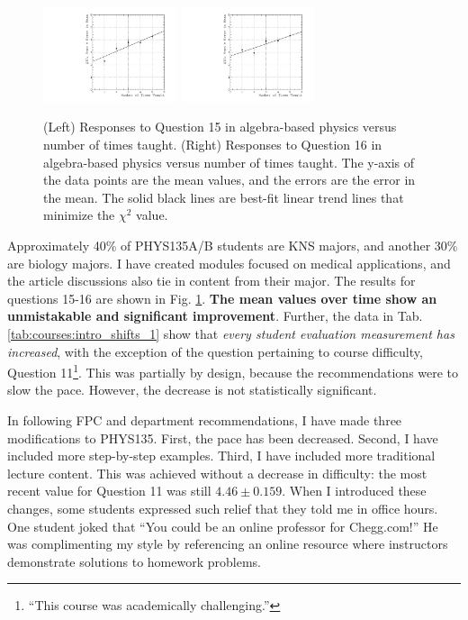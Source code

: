 \documentclass[../../main.tex]{subfiles}
\begin{document}
\begin{figure}
\centering
\includegraphics[width=0.35\textwidth]{Q15_algebra_based.pdf}
\includegraphics[width=0.35\textwidth]{Q16_algebra_based.pdf}
\caption{\label{fig:courses:intro_q15}  (Left) Responses to Question 15 in algebra-based physics versus number of times taught. (Right) Responses to Question 16 in algebra-based physics versus number of times taught.  The y-axis of the data points are the mean values, and the errors are the error in the mean.  The solid black lines are best-fit linear trend lines that minimize the $\chi^2$ value.}
\end{figure}

Approximately 40\% of PHYS135A/B students are KNS majors, and another 30\% are biology majors.  I have created modules focused on medical applications, and the article discussions also tie in content from their major.  The results for questions 15-16 are shown in Fig. \ref{fig:courses:intro_q15}.  \textbf{The mean values over time show an unmistakable and significant improvement}.  Further, the data in Tab. \ref{tab:courses:intro_shifts_1} show that \textit{every student evaluation measurement has increased}, with the exception of the question pertaining to course difficulty, Question 11\footnote{``This course was academically challenging.''}.  This was partially by design, because the recommendations were to slow the pace.  However, the decrease is not statistically significant.  \\ \hspace{0.1cm}

In following FPC and department recommendations, I have made three modifications to PHYS135.  First, the pace has been decreased.  Second, I have included more step-by-step examples.  Third, I have included more traditional lecture content.  This was achieved without a decrease in difficulty: the most recent value for Question 11 was still $4.46 \pm 0.159$.  When I introduced these changes, some students expressed such relief that they told me in office hours.  One student joked that ``You could be an online professor for Chegg.com!'' He was complimenting my style by referencing an online resource where instructors demonstrate solutions to homework problems.  \\ \hspace{0.1cm}
\end{document}
